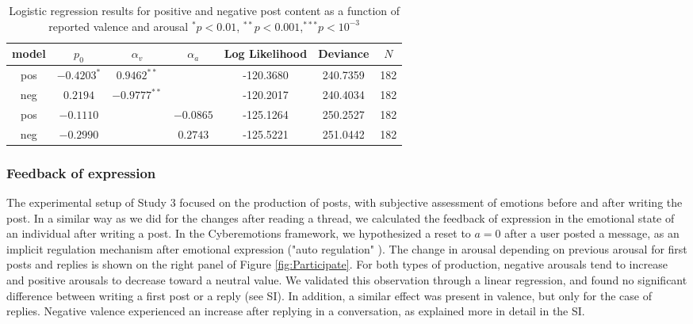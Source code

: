 \documentclass[nologo,url,11pt,a4paper]{ETHpaper}
\begin{document}
\begin{table}[!ht]
\centering

\begin{tabular}{ c | c  c  c  | c c c }
model & $p_0$ 					& $\alpha_v$ & $\alpha_a$ & Log Likelihood & Deviance  & $N$   \\ \hline 
pos   & $\mathbf{-0.4203}^{*}$ 	& $\mathbf{0.9462}^{**}$  & &  -120.3680 &  240.7359 & 182 \\
neg   & $0.2194$                & $\mathbf{-0.9777}^{**}$ & &  -120.2017 & 240.4034 & 182 \\
pos   & $-0.1110$  &  & $-0.0865$ & -125.1264 & 250.2527 & 182 \\
neg   & $-0.2990$  &  & $0.2743$ & -125.5221 & 251.0442 & 182 \\

\end{tabular}
\caption{Logistic regression results for positive and negative post content as a function of reported valence and arousal   $^{*} p<0.01$, $^{**} p<0.001$,$^{***} p<10^{-3}$
\label{tab:Expressionregs}}
\end{table}

\subsubsection{Feedback of expression}

The experimental setup of Study 3 focused on the production of posts, with
subjective assessment of emotions before and after writing the post. In a
similar way as we did for the changes after reading a thread, we calculated
the feedback of expression in the emotional state of an individual
after writing a post. In the Cyberemotions framework,
we hypothesized a reset to $a=0$ after a user posted a message, as an implicit
regulation mechanism after emotional expression ("auto regulation" \cite{Kappas2011,Kappas2013b}). The change in arousal
depending on previous arousal for first posts and replies is shown on the
right panel of  Figure \ref{fig:Participate}. For both types of production,
negative arousals tend to increase and positive arousals to decrease toward a
neutral value. We validated this observation through a linear regression, and
found no significant difference between writing a first post or a reply (see
SI). In addition, a similar effect was present in valence, but only for the
case of replies. Negative valence experienced an increase after replying in a conversation, as explained more in detail in the SI.
\end{document}
